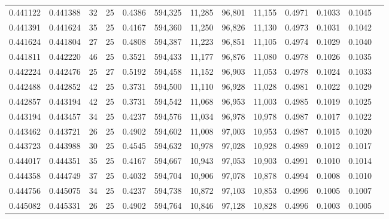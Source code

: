 \begin{tabular}{rrrrrrrrrrrrr}
0.441122 & 0.441388 &    32 &  25 &                                     0.4386 & 594,325 &  11,285 &  96,801 &  11,155 & 0.4971 & 0.1033 & 0.1045 \\
0.441391 & 0.441624 &    35 &  25 &                                     0.4167 & 594,360 &  11,250 &  96,826 &  11,130 & 0.4973 & 0.1031 & 0.1042 \\
0.441624 & 0.441804 &    27 &  25 &                                     0.4808 & 594,387 &  11,223 &  96,851 &  11,105 & 0.4974 & 0.1029 & 0.1040 \\
0.441811 & 0.442220 &    46 &  25 &                                     0.3521 & 594,433 &  11,177 &  96,876 &  11,080 & 0.4978 & 0.1026 & 0.1035 \\
0.442224 & 0.442476 &    25 &  27 &                                     0.5192 & 594,458 &  11,152 &  96,903 &  11,053 & 0.4978 & 0.1024 & 0.1033 \\
0.442488 & 0.442852 &    42 &  25 &                                     0.3731 & 594,500 &  11,110 &  96,928 &  11,028 & 0.4981 & 0.1022 & 0.1029 \\
0.442857 & 0.443194 &    42 &  25 &                                     0.3731 & 594,542 &  11,068 &  96,953 &  11,003 & 0.4985 & 0.1019 & 0.1025 \\
0.443194 & 0.443457 &    34 &  25 &                                     0.4237 & 594,576 &  11,034 &  96,978 &  10,978 & 0.4987 & 0.1017 & 0.1022 \\
0.443462 & 0.443721 &    26 &  25 &                                     0.4902 & 594,602 &  11,008 &  97,003 &  10,953 & 0.4987 & 0.1015 & 0.1020 \\
0.443723 & 0.443988 &    30 &  25 &                                     0.4545 & 594,632 &  10,978 &  97,028 &  10,928 & 0.4989 & 0.1012 & 0.1017 \\
0.444017 & 0.444351 &    35 &  25 &                                     0.4167 & 594,667 &  10,943 &  97,053 &  10,903 & 0.4991 & 0.1010 & 0.1014 \\
0.444358 & 0.444749 &    37 &  25 &                                     0.4032 & 594,704 &  10,906 &  97,078 &  10,878 & 0.4994 & 0.1008 & 0.1010 \\
0.444756 & 0.445075 &    34 &  25 &                                     0.4237 & 594,738 &  10,872 &  97,103 &  10,853 & 0.4996 & 0.1005 & 0.1007 \\
0.445082 & 0.445331 &    26 &  25 &                                     0.4902 & 594,764 &  10,846 &  97,128 &  10,828 & 0.4996 & 0.1003 & 0.1005 \\

\end{tabular}
